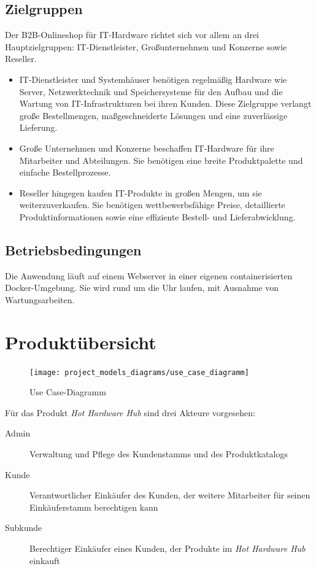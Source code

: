 \documentclass[%
	12pt,
	a4paper,
	oneside,
	parskip=full
]{scrbook}
\begin{document}
\section{Zielgruppen}
Der B2B-Onlineshop für IT-Hardware richtet sich vor allem an drei Hauptzielgruppen:
IT-Dienstleister, Großunternehmen und Konzerne sowie Reseller.
\begin{itemize}
	\item IT-Dienstleister und Systemhäuser benötigen regelmäßig Hardware wie Server, Netzwerktechnik und Speichersysteme für den Aufbau und die Wartung von IT-Infrastrukturen bei ihren Kunden.
	Diese Zielgruppe verlangt große Bestellmengen, maßgeschneiderte Lösungen und eine zuverlässige Lieferung.
	\item Große Unternehmen und Konzerne beschaffen IT-Hardware für ihre Mitarbeiter und Abteilungen.
	Sie benötigen eine breite Produktpalette und einfache Bestellprozesse.
	\item Reseller hingegen kaufen IT-Produkte in großen Mengen, um sie weiterzuverkaufen.
	Sie benötigen wettbewerbsfähige Preise, detaillierte Produktinformationen sowie eine effiziente Bestell- und Lieferabwicklung.
\end{itemize}
\section{Betriebsbedingungen}
Die Anwendung läuft auf einem Webserver in einer eigenen containerisierten Docker-Umgebung.
Sie wird rund um die Uhr laufen, mit Ausnahme von Wartungsarbeiten.

\chapter{Produktübersicht}
\begin{figure}[ht]
	\centering
	\texttt{[image: project\_models\_diagrams/use\_case\_diagramm]}
	\caption{Use Case-Diagramm}
\end{figure}
Für das Produkt \emph{Hot Hardware Hub} sind drei Akteure vorgesehen:
\begin{description}
	\item[Admin] Verwaltung und Pflege des Kundenstamms und des Produktkatalogs
	\item[Kunde] Verantwortlicher Einkäufer des Kunden, der weitere Mitarbeiter für seinen Einkäuferstamm berechtigen kann
	\item[Subkunde] Berechtiger Einkäufer eines Kunden, der Produkte im \emph{Hot Hardware Hub} einkauft
\end{description}
\end{document}
